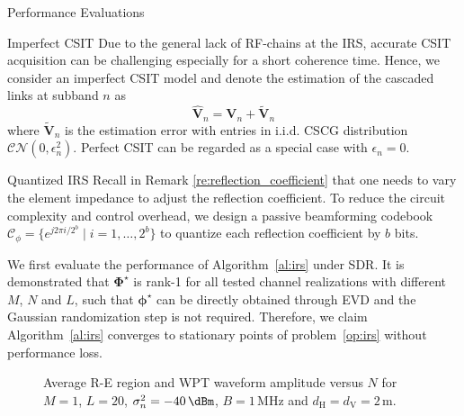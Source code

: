 \documentclass[journal]{IEEEtran}
\begin{document}
\begin{section}{Performance Evaluations}
		\begin{subsection}{Imperfect CSIT}
			Due to the general lack of RF-chains at the IRS, accurate CSIT acquisition can be challenging especially for a short coherence time. Hence, we consider an imperfect CSIT model and denote the estimation of the cascaded links at subband $n$ as
			\begin{equation}
				\hat{\boldsymbol{V}}_{n} = \boldsymbol{V}_{n} + \tilde{\boldsymbol{V}}_{n}
			\end{equation}
			where $\tilde{\boldsymbol{V}}_{n}$ is the estimation error with entries in i.i.d. CSCG distribution $\mathcal{CN}(0, \epsilon_{n}^2)$. Perfect CSIT can be regarded as a special case with $\epsilon_{n} = 0$. %
		\end{subsection}

		\begin{subsection}{Quantized IRS}
			Recall in Remark \ref{re:reflection_coefficient} that one needs to vary the element impedance to adjust the reflection coefficient. To reduce the circuit complexity and control overhead, we design a passive beamforming codebook $\mathcal{C}_\phi = \{e^{j 2 \pi i / 2^b} \mid i = 1, \dots, 2^b\}$ to quantize each reflection coefficient by $b$ bits.
		\end{subsection}

		We first evaluate the performance of Algorithm~\ref{al:irs} under SDR. It is demonstrated that $\boldsymbol{\Phi}^{\star}$ is rank-\num{1} for all tested channel realizations with different $M$, $N$ and $L$, such that $\boldsymbol{\phi}^{\star}$ can be directly obtained through EVD and the Gaussian randomization step is not required. Therefore, we claim Algorithm~\ref{al:irs} converges to stationary points of problem~\eqref{op:irs} without performance loss.

		\begin{figure}[!t]
			\centering
			\caption{Average R-E region and WPT waveform amplitude versus $N$ for $M=1$, $L=20$, $\sigma_n^2=-40\,\si{\dBm}$, $B=1\,\si{\MHz}$ and $d_{\mathrm{H}}=d_{\mathrm{V}}=2\,\si{\meter}$.}
		\end{figure}


\end{section}
\end{document}
